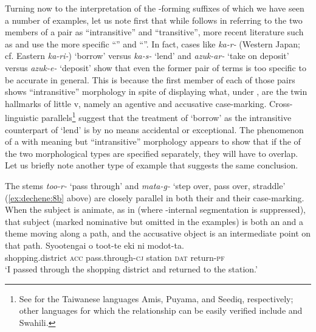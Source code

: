 \documentclass[output=paper,
modfonts
]{LSP/langsci}
\begin{document}
Turning now to the interpretation of the -forming suffixes of which
we have seen a number of examples, let us note first that while \citet{volpe2005a} follows \citet{jacobsen1982a,jacobsen1992a} in referring to the two members of
a  pair as ``intransitive'' and ``transitive'', more recent
literature such as \citet{harley2008a,harley2012a} and \citet{marantz2013a} use the more
specific ``'' and ``''. In fact, cases like
\textit{ka-r-} (Western Japan; cf. Eastern \textit{ka-ri-}) `borrow' versus
\textit{ka-s-} `lend' and \textit{azuk-ar-} `take on deposit' versus
\textit{azuk-e-} `deposit' show that even the former pair of terms is too
specific to be accurate in general. This is because the first member of
each of those pairs shows ``intransitive'' morphology in spite of
displaying what, under , are the twin hallmarks
of  little v, namely an agentive  and
accusative case-marking. Cross-linguistic parallels\footnote{See \citet[59, 84--85, 107]{kuo2015a} for the Taiwanese languages Amis, Puyama, and Seediq, respectively; other languages for which the relationship can
  be easily verified include  and Swahili.} suggest that the
treatment of `borrow' as the intransitive counterpart of `lend' is by no
means accidental or exceptional. The phenomenon of a  with 
meaning but ``intransitive'' morphology appears to show that if the
 of the two morphological types are specified separately, they
will have to overlap. Let us briefly note another type of example that
suggests the same conclusion.

The stems \textit{too-r-} `pass through' and \textit{mata-g-} `step over,
pass over, straddle' (\ref{ex:dechene:8b} above) are closely parallel in both their
 and their case-marking. When the subject is animate, as in
 (where -internal segmentation is suppressed), that subject
(marked nominative but omitted in the examples) is both an  and a
theme moving along a path, and the accusative object is an intermediate
point on that path.
\ea \label{ex:dechene:15}
	\ea \label{ex:dechene:15a} 
	\gll Syootengai o toot-te eki ni modot-ta.\\
	shopping.district \textsc{acc} pass.through-\textsc{cj} station \textsc{dat} return-\textsc{pf}\\
	\glt `I passed through the shopping district and returned to the station.'
\end{document}
